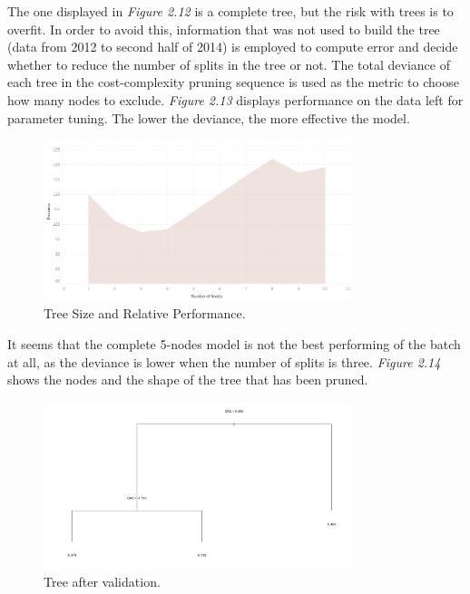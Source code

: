 \documentclass{book}
\begin{document}
The one displayed in \textit{Figure 2.12} is a complete tree, but the risk with trees is to overfit. In order to avoid this, information that was not used to build the tree (data from 2012 to second half of 2014) is employed to compute error and decide whether to reduce the number of splits in the tree or not. The total deviance of each tree in the cost-complexity pruning sequence is used as the metric to choose how many nodes to exclude. \textit{Figure 2.13} displays performance on the data left for parameter tuning. The lower the deviance, the more effective the model.

\bigskip
\begin{figure}[H]
\begin{center}
\captionsetup{justification=centering}
\includegraphics[width=0.8\textwidth]{Images/tre.png}
\caption{Tree Size and Relative Performance.}
\end{center}
\end{figure}
\bigskip

It seems that the complete 5-nodes model is not the best performing of the batch at all, as the deviance is lower when the number of splits is three. \textit{Figure 2.14} shows the nodes and the shape of the tree that has been pruned.

\bigskip
\begin{figure}[H]
\begin{center}
\captionsetup{justification=centering}
\includegraphics[width=0.8\textwidth]{Images/trep.png}
\caption{Tree after validation.}
\end{center}
\end{figure}
\bigskip
\end{document}
